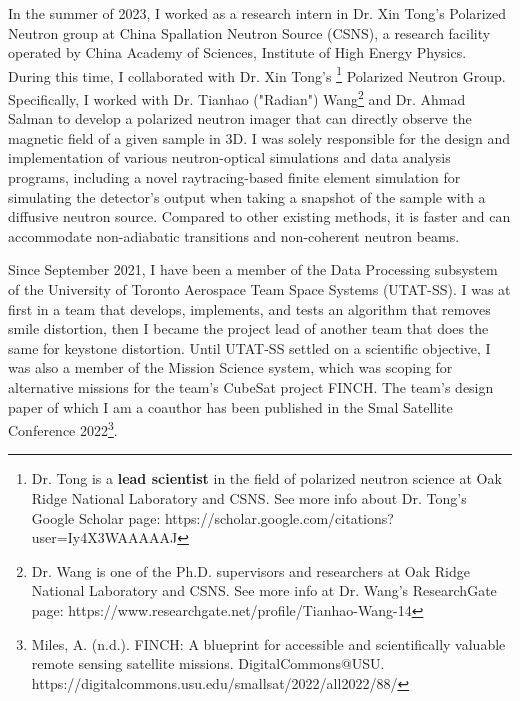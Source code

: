 \documentclass{article}
\begin{document}
\hspace{2em}In the summer of 2023, I worked as a research intern in Dr. Xin Tong's Polarized Neutron group at China Spallation Neutron Source (CSNS), a research facility operated by China Academy of Sciences, Institute of High Energy Physics. During this time, I collaborated with Dr. Xin Tong's \footnote[1]{Dr. Tong is a \textbf{lead scientist} in the field of polarized neutron science at Oak Ridge National Laboratory and CSNS. \newline See more info about Dr. Tong's Google Scholar page: https://scholar.google.com/citations?user=Iy4X3WAAAAAJ} Polarized Neutron Group. Specifically, I worked with Dr. Tianhao ("Radian") Wang\footnote[2]{Dr. Wang is one of the Ph.D. supervisors and researchers at Oak Ridge National Laboratory and CSNS. \newline See more info at Dr. Wang's ResearchGate page: https://www.researchgate.net/profile/Tianhao-Wang-14} and Dr. Ahmad Salman to develop a polarized neutron imager that can directly observe the magnetic field of a given sample in 3D. I was solely responsible for the design and implementation of various neutron-optical simulations and data analysis programs, including a novel raytracing-based finite element simulation for simulating the detector's output when taking a snapshot of the sample with a diffusive neutron source. Compared to other existing methods, it is faster and can accommodate non-adiabatic transitions and non-coherent neutron beams.

Since September 2021, I have been a member of the Data Processing subsystem of the University of Toronto Aerospace Team Space Systems (UTAT-SS). I was at first in a team that develops, implements, and tests an algorithm that removes smile distortion, then I became the project lead of another team that does the same for keystone distortion. Until UTAT-SS settled on a scientific objective, I was also a member of the Mission Science system, which was scoping for alternative missions for the team's CubeSat project FINCH. The team's design paper of which I am a coauthor has been published in the Smal Satellite Conference 2022\footnote[3]{Miles, A. (n.d.). FINCH: A blueprint for accessible and scientifically valuable remote sensing satellite missions. DigitalCommons@USU. \newline https://digitalcommons.usu.edu/smallsat/2022/all2022/88/}.

\end{document}
